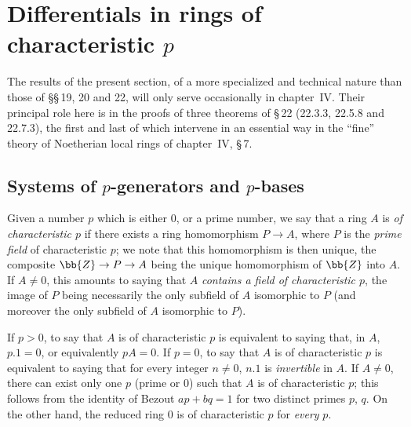 \section{Differentials in rings of characteristic \texorpdfstring{$p$}{p}}
\label{section:0.21}

The results of the present section, of a more specialized and technical nature than those of \S\S\,19, 20 and 22, will only serve occasionally in chapter~IV.
Their principal role here is in the proofs of three theorems of \S\,22 (22.3.3, 22.5.8 and 22.7.3), the first and last of which intervene in an essential way in the ``fine'' theory of Noetherian local rings of chapter~IV, \S\,7.

\subsection{Systems of \texorpdfstring{$p$}{p}-generators and \texorpdfstring{$p$}{p}-bases}
\label{subsection:0.21.1}

\begin{env}[21.1.1]
\label{0.21.1.1}
Given a number $p$ which is either $0$, or a prime number, we say that a ring $A$ is \emph{of characteristic $p$} if there exists a ring homomorphism $P\to A$, where $P$ is the \emph{prime field} of characteristic $p$; we note that this homomorphism is then unique, the composite $\bb{Z}\to P\to A$ being the unique homomorphism of $\bb{Z}$ into $A$.
If $A\neq 0$, this amounts to saying that $A$ \emph{contains a field of characteristic $p$}, the image of $P$ being necessarily the only subfield of $A$ isomorphic to $P$ (and moreover the only subfield of $A$ isomorphic to $P$).
\end{env}

\begin{env}[21.1.2]
\label{0.21.1.2}
If $p>0$, to say that $A$ is of characteristic $p$ is equivalent to saying that, in $A$, $p.1=0$, or equivalently $pA=0$.
If $p=0$, to say that $A$ is of characteristic $p$ is equivalent to saying that for every integer $n\neq 0$, $n.1$ is \emph{invertible} in $A$.
If $A\neq 0$, there can exist only one $p$ (prime or $0$) such that $A$ is of characteristic $p$; this follows from the identity of Bezout $ap+bq=1$ for two distinct primes $p$, $q$.
On the other hand, the reduced ring $0$ is of characteristic $p$ for \emph{every} $p$.
\end{env}

